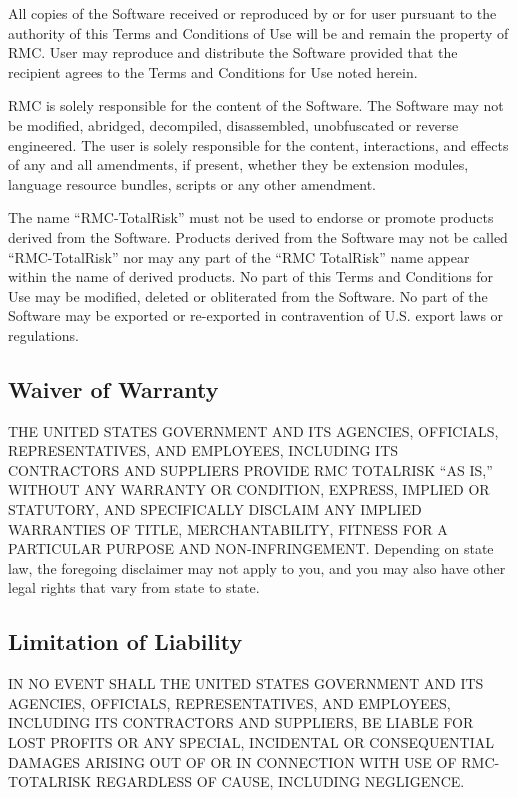 \documentclass[
]{book}
\begin{document}
All copies of the Software received or reproduced by or for user pursuant to the authority of this Terms and Conditions of Use will be and remain the property of RMC. User may reproduce and distribute the Software provided that the recipient agrees to the Terms and Conditions for Use noted herein.

RMC is solely responsible for the content of the Software. The Software may not be modified, abridged, decompiled, disassembled, unobfuscated or reverse engineered. The user is solely responsible for the content, interactions, and effects of any and all amendments, if present, whether they be extension modules, language resource bundles, scripts or any other amendment.

The name ``RMC-TotalRisk'' must not be used to endorse or promote products derived from the Software. Products derived from the Software may not be called ``RMC-TotalRisk'' nor may any part of the ``RMC TotalRisk'' name appear within the name of derived products. No part of this Terms and Conditions for Use may be modified, deleted or obliterated from the Software. No part of the Software may be exported or re-exported in contravention of U.S. export laws or regulations.

\hypertarget{waiver-of-warranty}{%
\subsection{Waiver of Warranty}\label{waiver-of-warranty}}

THE UNITED STATES GOVERNMENT AND ITS AGENCIES, OFFICIALS, REPRESENTATIVES, AND EMPLOYEES, INCLUDING ITS CONTRACTORS AND SUPPLIERS PROVIDE RMC TOTALRISK ``AS IS,'' WITHOUT ANY WARRANTY OR CONDITION, EXPRESS, IMPLIED OR STATUTORY, AND SPECIFICALLY DISCLAIM ANY IMPLIED WARRANTIES OF TITLE, MERCHANTABILITY, FITNESS FOR A PARTICULAR PURPOSE AND NON-INFRINGEMENT. Depending on state law, the foregoing disclaimer may not apply to you, and you may also have other legal rights that vary from state to state.

\hypertarget{limitation-of-liability}{%
\subsection{Limitation of Liability}\label{limitation-of-liability}}

IN NO EVENT SHALL THE UNITED STATES GOVERNMENT AND ITS AGENCIES, OFFICIALS, REPRESENTATIVES, AND EMPLOYEES, INCLUDING ITS CONTRACTORS AND SUPPLIERS, BE LIABLE FOR LOST PROFITS OR ANY SPECIAL, INCIDENTAL OR CONSEQUENTIAL DAMAGES ARISING OUT OF OR IN CONNECTION WITH USE OF RMC-TOTALRISK REGARDLESS OF CAUSE, INCLUDING NEGLIGENCE.
\end{document}
